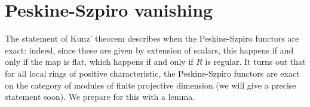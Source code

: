 \documentclass[11pt]{book}
\newtheorem{corollary}[theorem]{Corollary}
\numberwithin{equation}{section}
\numberwithin{theorem}{chapter}
\theoremstyle{definition}
\newtheorem*{basic properties}{Basic Properties}
\newtheorem*{Important Remark}{Important Remark}
\theoremstyle{remark}
\newcommand{\m}{\mathfrak{m}}
\newcommand{\cF}{\mathcal{F}}
\begin{document}
%	
%	
%	
%



\section{Peskine-Szpiro vanishing}

The statement of Kunz' theorem describes when the Peskine-Szpiro functors are exact: indeed, since these are given by extension of scalars, this happens if and only if the map is flat, which happens if and only if $R$ is regular. It turns out that for all local rings of positive characteristic, the Peskine-Szpiro functors are exact on the category of modules of finite projective dimension (we will give a precise statement soon). We prepare for this with a lemma.
\end{document}
